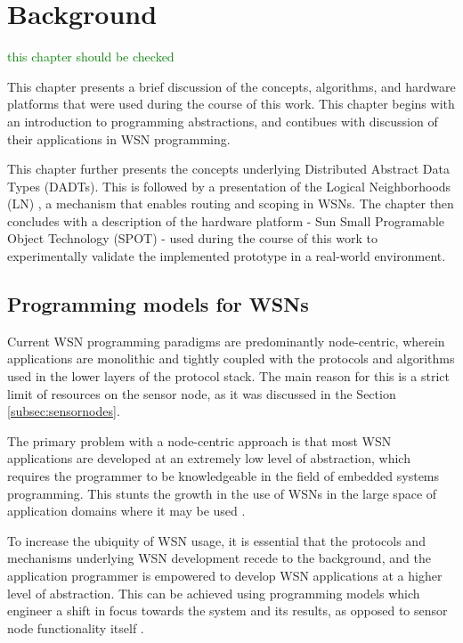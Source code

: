\chapter{Background}


\textcolor{green}{this chapter should be checked}

This chapter presents a brief discussion of the concepts, algorithms, and 
hardware platforms that were used during the course of this work. This
chapter begins with an introduction to programming abstractions, and contibues
with discussion of their applications in WSN programming.

This chapter further presents the concepts underlying
Distributed Abstract Data Types (DADTs). This is followed by a presentation of
the Logical Neighborhoods (LN) \cite{mottola_LNScoping:2006}, a mechanism that
enables routing and scoping in WSNs. The chapter then concludes 
with a description of the hardware platform - Sun Small Programable Object
Technology (SPOT) \cite{simon_squawk:2006} - used during the course of this work
to experimentally validate the implemented prototype in a
real-world environment. 

\section {Programming models for WSNs}

Current WSN programming paradigms are predominantly node-centric, wherein
applications are monolithic and tightly coupled with the protocols and algorithms
used in the lower layers of the protocol stack. 
The main reason for this is a strict limit of resources on the sensor node, as
it was discussed in the Section \ref{subsec:sensornodes}.

The primary problem with a node-centric approach is that most WSN applications
are developed at an extremely low level of abstraction, which requires the programmer to be knowledgeable in the field of
embedded systems programming. This stunts the growth in the use of WSNs in the
large space of application domains where it may be used
\cite{mottola_middleware:2008}. 

To increase the ubiquity of WSN
usage, it is essential that the protocols and mechanisms underlying WSN
development recede to the background, and the application programmer is
empowered to develop WSN applications at a higher level of abstraction. This
can be achieved using programming models which engineer a shift in focus
towards the system and its results, as opposed to sensor node functionality
itself \cite{mottola_middleware:2008}. 

